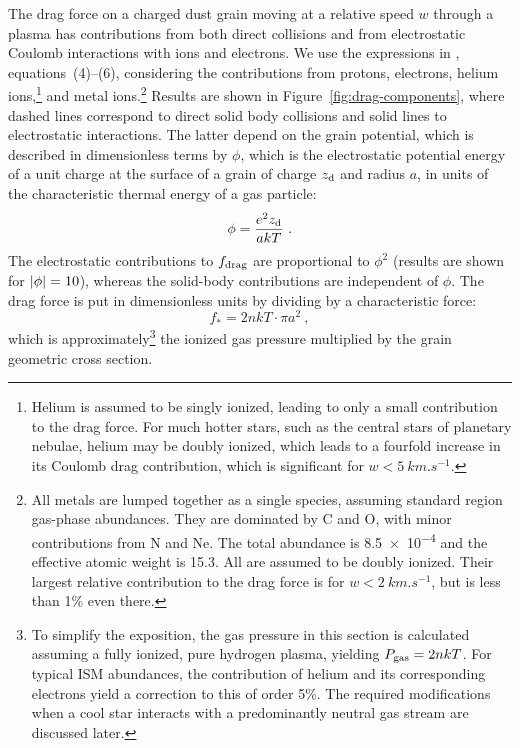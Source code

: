 The drag force on a charged dust grain moving at a relative speed
\(w\) through a plasma has contributions from both direct collisions
and from electrostatic Coulomb interactions with ions and electrons.
We use the expressions in \citet{Draine:1979a}, equations~(4)--(6),
considering the contributions from protons, electrons, helium
ions,\footnote{Helium is assumed to be singly ionized, leading to only
  a small contribution to the drag force.  For much hotter stars, such
  as the central stars of planetary nebulae, helium may be doubly
  ionized, which leads to a fourfold increase in its Coulomb drag
  contribution, which is significant for \(w < \SI{5}{km.s^{-1}}\).} %
and metal ions.\footnote{%
  \label{fn:metal-drag}
  All metals are lumped together as a single species, assuming
  standard \hii{} region gas-phase abundances.  They are dominated by
  C and O, with minor contributions from N and Ne.  The total
  abundance is \num{8.5e-4} and the effective atomic weight is
  \num{15.3}.  All are assumed to be doubly ionized.  Their largest
  relative contribution to the drag force is for
  \(w < \SI{2}{km.s^{-1}}\), but is less than 1\% even there.} %
Results are shown in Figure~\ref{fig:drag-components}, where dashed
lines correspond to direct solid body collisions and solid lines to
electrostatic interactions.  The latter depend on the grain potential,
which is described in dimensionless terms by \(\phi\), which is the
electrostatic potential energy of a unit charge at the surface of a
grain of charge \(z_{\text{d}}\) and radius \(a\), in units of the
characteristic thermal energy of a gas particle:
\begin{equation}
  \label{eq:phi-potential}
  \phi = \frac{e^2 z_{\text{d}}}{a kT} \ .
\end{equation}
The electrostatic contributions to \(f_{\text{drag}}\) are proportional to
\(\phi^2\) (results are shown for \(\lvert\phi\rvert = 10\)), whereas the
solid-body contributions are independent of \(\phi\).  The drag force is
put in dimensionless units by dividing by a characteristic force:
\begin{equation}
  \label{eq:fstar}
  f_* = 2 n k T \cdot \pi a^2 \ , 
\end{equation}
which is approximately\footnote{%
  To simplify the exposition, the gas pressure in this section is
  calculated assuming a fully ionized, pure hydrogen plasma, yielding
  \(P_{\text{gas}} = 2 n k T\). For typical ISM abundances, the contribution of
  helium and its corresponding electrons yield a correction to this of
  order 5\%.  The required modifications when a cool star interacts
  with a predominantly neutral gas stream are discussed later.  } %
the ionized gas pressure multiplied by the grain geometric cross
section.

